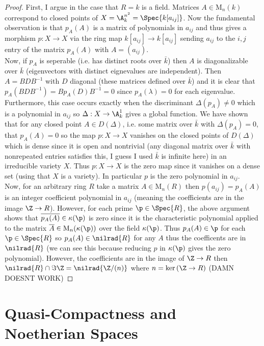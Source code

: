 \documentclass[12pt]{article}
\begin{document}
\begin{proof}
First, I argue in the case that $R = k$ is a field.
Matrices $A \in \mathrm{M}_n(k)$ correspond to closed points of $X = \A^{n^2}_k = \Spec{k[a_{ij}]}$. Now the fundamental observation is that $p_A(A)$ is a matrix of polynomials in $a_{ij}$ and thus gives a morphism $p : X \to X$ via the ring map $k[a_{ij}] \to k[a_{ij}]$ sending $a_{ij}$ to the $i,j$ entry of the matrix $p_A(A)$ with $A = (a_{ij})$. 
\bigskip\\
Now, if $p_A$ is seperable (i.e. has distinct roots over $\bar{k}$) then $A$ is diagonalizable over $\bar{k}$ (eigenvectors with distinct eignevalues are independent). Then $A = B D B^{-1}$ with $D$ diagonal (these matrices defined over $\bar{k}$) and it is clear that $p_A(B D B^{-1}) = B p_A(D) B^{-1} = 0$ since $p_A(\lambda) = 0$ for each eigenvalue. Furthermore, this case occurs exactly when the discriminant $\Delta(p_A) \neq 0$ which is a polynomial in $a_{ij}$ so $\Delta : X \to \A^1_k$ gives a global function. We have shown that for any closed point $A \in D(\Delta)$, i.e. some matrix over $\bar{k}$ with $\Delta(p_A) = 0$, that  $p_A(A) = 0$ so the map $p : X \to X$ vanishes on the closed points of $D(\Delta)$ which is dense since it is open and nontrivial (any diagonal matrix over $\bar{k}$ with nonrepeated entries satisfies this, I guess I used $\bar{k}$ is infinite here) in an irreducible variety $X$. Thus $p : X \to X$ is the zero map since it vanishes on a dense set (using that $X$ is a variety). In particular $p$ is the zero polynomial in $a_{ij}$.
\bigskip\\
Now, for an arbitrary ring $R$ take a matrix $A \in \mathrm{M}_n(R)$ then $p(a_{ij}) = p_A(A)$ is an integer coefficient polynomial in $a_{ij}$ (meaning the coefficients are in the image $\Z \to R$). However, for each prime $\p \in \Spec{R}$, the above argument shows that $\overline{p_A(A)} \in \kappa(\p)$ is zero since it is the characteristic polynomial applied to the matrix $\overline{A} \in \mathrm{M}_n(\kappa(\p))$ over the field $\kappa(\p)$. Thus $p_A(A) \in \p$ for each $\p \in \Spec{R}$ so $p_A(A) \in \nilrad{R}$ for any $A$ thus the coefficents are in $\nilrad{R}$ (we can see this because reducing $p$ in $\kappa(\p)$ gives the zero polynomial). However, the coefficients are in the image of $\Z \to R$ then $\nilrad{R} \cap \Im{\Z} = \nilrad{\Z / (n)}$ where $n = \ker{(\Z \to R)}$ 
(DAMN DOESNT WORK)
\end{proof}

\section{Quasi-Compactness and Noetherian Spaces}
\end{document}

